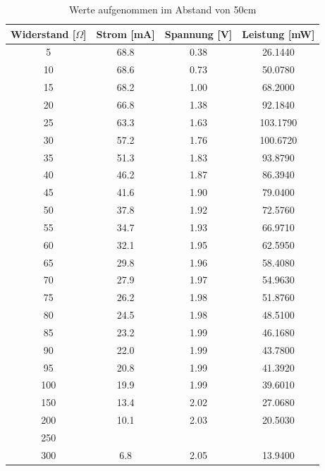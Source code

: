 \begin{table}[htbp]
\begin{tabular}{|c|c|c|c|}
\hline 
Widerstand [$\Omega$]	&Strom [mA]	&Spannung [V]	&Leistung [mW]\\	 
\hline 
5	&68.8	&0.38	&26.1440\\
10	&68.6	&0.73	&50.0780\\
15	&68.2	&1.00	&68.2000\\
20	&66.8	&1.38	&92.1840\\
25	&63.3	&1.63	&103.1790\\
30	&57.2	&1.76	&100.6720\\
35	&51.3	&1.83	&93.8790\\
40	&46.2	&1.87	&86.3940\\
45	&41.6	&1.90	&79.0400\\
50	&37.8	&1.92	&72.5760\\
55	&34.7	&1.93	&66.9710\\
60	&32.1	&1.95	&62.5950\\
65	&29.8	&1.96	&58.4080\\
70	&27.9	&1.97	&54.9630\\
75	&26.2	&1.98	&51.8760\\
80	&24.5	&1.98	&48.5100\\
85	&23.2	&1.99	&46.1680\\
90	&22.0	&1.99	&43.7800\\
95	&20.8	&1.99	&41.3920\\
100	&19.9	&1.99	&39.6010\\
150	&13.4	&2.02	&27.0680\\
200	&10.1	&2.03	&20.5030\\
250	& & &		\\
300	&6.8	&2.05	&13.9400\\
\hline 
\end{tabular}
\caption{Werte aufgenommen im Abstand von 50cm}
\end{table}


